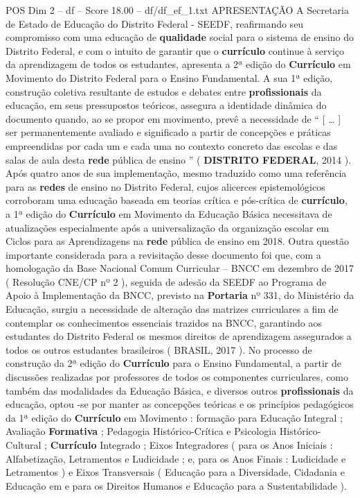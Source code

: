\begin{textsample}{POS Dim 2 – df – Score 18.00 – df/df\_ef\_1.txt}  \label{ex:f2_pos_127}
APRESENTAÇÃO A Secretaria de Estado de Educação do Distrito Federal - SEEDF, reafirmando seu compromisso com uma educação de \textbf{qualidade} social para o sistema de ensino do Distrito Federal, e com o intuito de garantir que o \textbf{currículo} continue à serviço da aprendizagem de todos os estudantes, apresenta a 2ª edição do \textbf{Currículo} em Movimento do Distrito Federal para o Ensino Fundamental.
A sua 1ª edição, construção coletiva resultante de estudos e debates entre \textbf{profissionais} da educação, em seus pressupostos teóricos, assegura a identidade dinâmica do documento quando, ao se propor em movimento, prevê a necessidade de “ [ … ] ser permanentemente avaliado e significado a partir de concepções e práticas empreendidas por cada um e cada uma no contexto concreto das escolas e das salas de aula desta \textbf{rede} pública de ensino ” ( \textbf{DISTRITO} \textbf{FEDERAL}, 2014 ).
Após quatro anos de sua implementação, mesmo traduzido como uma referência para as \textbf{redes} de ensino no Distrito Federal, cujos alicerces epistemológicos corroboram uma educação baseada em teorias crítica e pós-crítica de \textbf{currículo}, a 1ª edição do \textbf{Currículo} em Movimento da Educação Básica necessitava de atualizações especialmente após a universalização da organização escolar em Ciclos para as Aprendizagens na \textbf{rede} pública de ensino em 2018.
Outra questão importante considerada para a revisitação desse documento foi que, com a homologação da Base Nacional Comum Curricular – BNCC em dezembro de 2017 ( Resolução CNE/CP nº 2 ), seguida de adesão da SEEDF ao Programa de Apoio à Implementação da BNCC, previsto na \textbf{Portaria} nº 331, do Ministério da Educação, surgiu a necessidade de alteração das matrizes curriculares a fim de contemplar os conhecimentos essenciais trazidos na BNCC, garantindo aos estudantes do Distrito Federal os mesmos direitos de aprendizagem assegurados a todos os outros estudantes brasileiros ( BRASIL, 2017 ).
No processo de construção da 2ª edição do \textbf{Currículo} para o Ensino Fundamental, a partir de discussões realizadas por professores de todos os componentes curriculares, como também das modalidades da Educação Básica, e diversos outros \textbf{profissionais} da educação, optou -se por manter as concepções teóricas e os princípios pedagógicos da 1ª edição do \textbf{Currículo} em Movimento : formação para Educação Integral ; Avaliação \textbf{Formativa} ; Pedagogia Histórico-Crítica e Psicologia Histórico-Cultural ; \textbf{Currículo} Integrado ; Eixos Integradores ( para os Anos Iniciais : Alfabetização, Letramentos e Ludicidade ; e, para os Anos Finais : Ludicidade e Letramentos ) e Eixos Transversais ( Educação para a Diversidade, Cidadania e Educação em e para os Direitos Humanos e Educação para a Sustentabilidade ).

\end{textsample}
